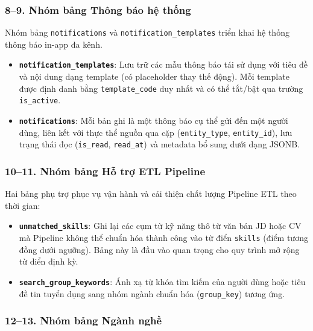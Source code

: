 \subsubsection*{8--9. Nhóm bảng Thông báo hệ thống}

Nhóm bảng \texttt{notifications} và \texttt{notification\_\allowbreak templates} triển khai hệ thống thông báo in-app đa kênh.

\begin{itemize}
    \item \textbf{\texttt{notification\_\allowbreak templates}}: Lưu trữ các mẫu thông báo tái sử dụng với tiêu đề và nội dung dạng template (có placeholder thay thế động). Mỗi template được định danh bằng \texttt{template\_\allowbreak code} duy nhất và có thể tắt/bật qua trường \texttt{is\_active}.
    \item \textbf{\texttt{notifications}}: Mỗi bản ghi là một thông báo cụ thể gửi đến một người dùng, liên kết với thực thể nguồn qua cặp (\texttt{entity\_type}, \texttt{entity\_id}), lưu trạng thái đọc (\texttt{is\_read}, \texttt{read\_at}) và metadata bổ sung dưới dạng JSONB.
\end{itemize}

\subsubsection*{10--11. Nhóm bảng Hỗ trợ ETL Pipeline}

Hai bảng phụ trợ phục vụ vận hành và cải thiện chất lượng Pipeline ETL theo thời gian:

\begin{itemize}
    \item \textbf{\texttt{unmatched\_\allowbreak skills}}: Ghi lại các cụm từ kỹ năng thô từ văn bản JD hoặc CV mà Pipeline không thể chuẩn hóa thành công vào từ điển \texttt{skills} (điểm tương đồng dưới ngưỡng). Bảng này là đầu vào quan trọng cho quy trình mở rộng từ điển định kỳ.
    \item \textbf{\texttt{search\_\allowbreak group\_\allowbreak keywords}}: Ánh xạ từ khóa tìm kiếm của người dùng hoặc tiêu đề tin tuyển dụng sang nhóm ngành chuẩn hóa (\texttt{group\_key}) tương ứng.
\end{itemize}

\subsubsection*{12--13. Nhóm bảng Ngành nghề}

